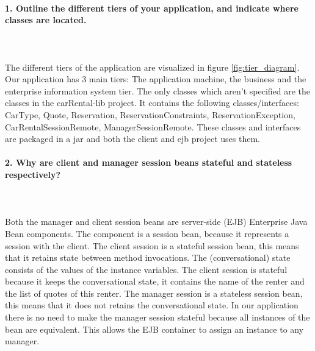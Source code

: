 \documentclass{ds-report}
\begin{document}
	\maketitle

	\paragraph{1. Outline the different tiers of your application, and indicate where classes are located.} \mbox{}\\\\
The different tiers of the application are visualized in figure \ref{fig:tier_diagram}.
Our application has 3 main tiers: The application machine, the business and the enterprise information system tier. The only classes which aren't specified are the classes in the carRental-lib project. It contains the following classes/interfaces: CarType, Quote, Reservation, ReservationConstraints, ReservationException, CarRentalSessionRemote, ManagerSessionRemote. These classes and interfaces are packaged in a jar and both the client and ejb project uses them.

	
	\paragraph{2. Why are client and manager session beans stateful and stateless respectively?} \mbox{}\\\\
Both the manager and client session beans are server-side (EJB) Enterprise Java Bean components. The component is a session bean, because it represents a session with the client.
The client session is a stateful session bean, this means that it retains state between method invocations. The (conversational) state consists of the values of the instance variables. The client session is stateful because it keeps the conversational state, it contains the name of the renter and the list of quotes of this renter.
The manager session is a stateless session bean, this means that it does not retains the conversational state. In our application there is no need to make the manager session stateful because all instances of the bean are equivalent. This allows the EJB container to assign an instance to any manager.
\end{document}
